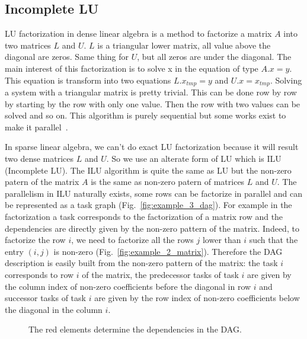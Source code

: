 \subsection{Incomplete LU}
LU factorization in dense linear algebra is a method to factorize a matrix $A$ into two matrices $L$ and $U$.
%
$L$ is a triangular lower matrix, all value above the diagonal are zeros.
%
Same thing for $U$, but all zeros are under the diagonal.
%
The main interest of this factorization is to solve x in the equation of type $A.x=y$.
%
This equation is transform into two equations $L.x_{tmp}=y$ and $U.x=x_{tmp}$.
%
Solving a system with a triangular matrix is pretty trivial.
%
This can be done row by row by starting by the row with only one value.
%
Then the row with two values can be solved and so on.
%
This algorithm is purely sequential but some works exist to make it parallel~\cite{plasma_lu}.



In sparse linear algebra, we can't do exact LU factorization because it will result two dense matrices $L$ and $U$.
%
So we use an alterate form of LU which is ILU (Incomplete LU).
%
The ILU algorithm is quite the same as LU but the non-zero patern of the matrix $A$ is the same as non-zero patern of matrices $L$ and $U$.
%
The parallelism in ILU naturally exists, some rows can be factorize in parallel and can be represented as a task graph (Fig.~\ref{fig:example_3_dag}).
%
For example in the factorization a task corresponds to the factorization of a matrix row and the dependencies are directly given by the non-zero pattern of the matrix.
%
Indeed, to factorize the row $i$, we need to factorize all the rows $j$ lower than $i$ such that the entry $(i,j)$ is non-zero (Fig.~\ref{fig:example_2_matrix}).
%
Therefore the DAG description is easily built from the non-zero pattern of the matrix:
%
the task $i$ corresponds to row $i$ of the matrix, the predecessor tasks of task $i$ are given by the column index of non-zero coefficients before the diagonal in row $i$ and successor tasks of task $i$ are given by the row index of non-zero coefficients below the diagonal in the column $i$.

\begin{figure}[!ht]
     \begin{center}
    \end{center}
    \caption{The red elements determine the dependencies in the DAG.}
    \label{fig:exemple_3_dag}
\end{figure}


